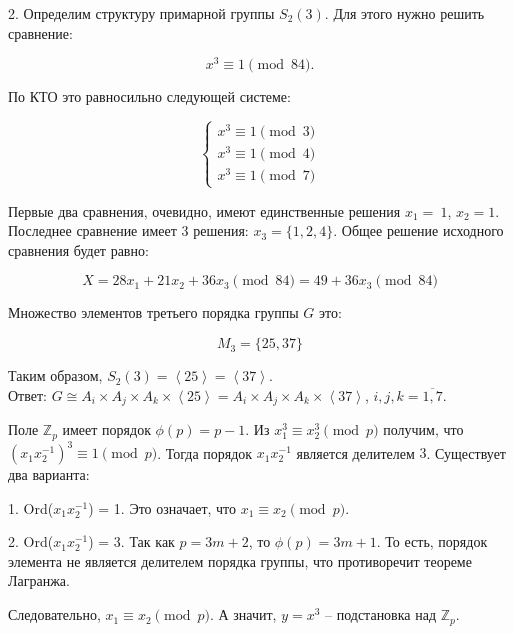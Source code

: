 2. Определим структуру примарной группы $S_2(3)$. Для этого нужно решить сравнение:

$$x^3 \equiv 1 \pmod{84}.$$

По КТО это равносильно следующей системе:

\begin{equation*}
	\begin{cases}
	x^3 \equiv 1 \pmod 3 \\
	x^3 \equiv 1 \pmod 4 \\
	x^3 \equiv 1 \pmod 7
	\end{cases}
\end{equation*}

Первые два сравнения, очевидно, имеют единственные решения $x_1 =~1$, $x_2 = 1$. Последнее сравнение имеет 3 решения: $x_3 = \{1, 2, 4\}$. Общее решение исходного сравнения будет равно:

$$X = 28 x_1 + 21 x_2 + 36 x_3 \pmod {84} = 49 + 36 x_3 \pmod {84}$$

Множество элементов третьего порядка группы $G$ это:

$$M_3 = \{25, 37\}$$

Таким образом, $S_2(3) = \left\langle 25 \right\rangle = \left\langle 37 \right\rangle$. \\

\noindent Ответ: $G \cong A_i \times A_j \times A_k \times \left\langle 25 \right\rangle = A_i \times A_j \times A_k \times \left\langle 37 \right\rangle$, $i, j, k = \overline{1, 7}$. 


Поле $\mathbb{Z}_p$ имеет порядок $\phi(p) = p - 1$.
Из $x_1^3 \equiv x_2^3 \pmod p$ получим, что $(x_1 x_2 ^{-1})^3 \equiv 1 \pmod p$. Тогда порядок $x_1 x_2^{-1}$ является делителем $3$. Существует два варианта:

1. Ord($x_1 x_2^{-1}$) = 1. Это означает, что $x_1 \equiv x_2 \pmod p$.

2. Ord($x_1 x_2^{-1}$) = 3. Так как $p = 3m + 2$, то $\phi(p) = 3m + 1$. То есть, порядок элемента не является делителем порядка группы, что противоречит теореме Лагранжа.

Следовательно, $x_1 \equiv x_2 \pmod p$. А значит, $y = x^3$ -- подстановка над $\mathbb{Z}_p$.


